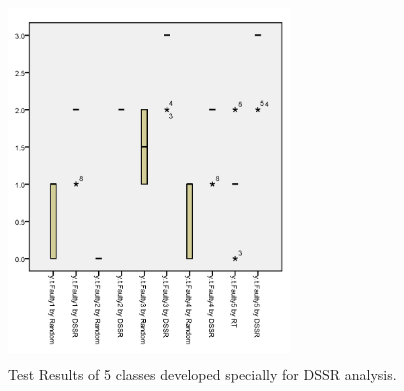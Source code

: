 \begin{figure}[htp]
\centering
\includegraphics[width=7.5cm,height=9.5cm]{figures/owntests.png}
\caption{Test Results of 5 classes developed specially for DSSR analysis.}
\label{fig:Result1}
\end{figure}





